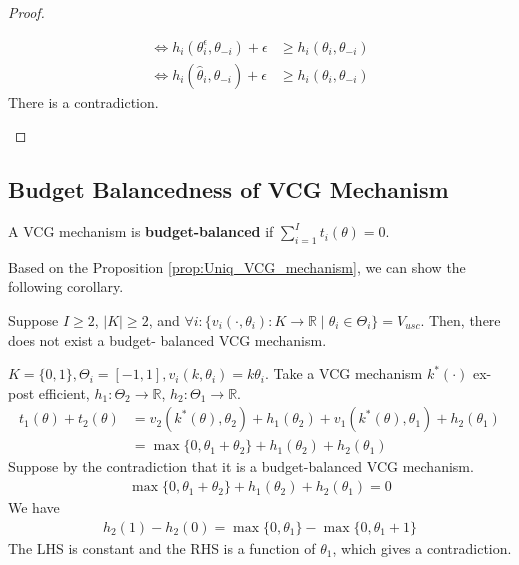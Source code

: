 \documentclass[11pt]{elegantbook}
\begin{document}
\begin{proof}
\begin{enumerate}
\begin{enumerate}[$\circ$]
\begin{equation}
\begin{aligned}
                    \Leftrightarrow h_i(\theta^\epsilon_i,\theta_{-i})+\epsilon&\geq h_i(\theta_i,\theta_{-i})\\
                    \Leftrightarrow h_i(\hat{\theta}_i,\theta_{-i})+\epsilon&\geq h_i(\theta_i,\theta_{-i})
                \end{aligned}
                \nonumber
            \end{equation}
            There is a contradiction.
        \end{enumerate}
    \end{enumerate}
\end{proof}


\subsection{Budget Balancedness of VCG Mechanism}
\begin{definition}
    \normalfont
    A VCG mechanism is \textbf{budget-balanced} if $\sum_{i=1}^It_i(\theta)=0$.
\end{definition}

Based on the Proposition \ref{prop:Uniq_VCG_mechanism}, we can show the following corollary.
\begin{corollary}
    Suppose $I\geq 2$, $|K|\geq 2$, and $\forall i: \{v_i(\cdot,\theta_i): K \rightarrow \mathbb{R}\mid \theta_i\in\Theta_i\}=V_{usc}$. Then, there does not exist a budget-
    balanced VCG mechanism.
\end{corollary}


\begin{example}
    $K=\{0,1\},\Theta_i=[-1,1], v_i(k,\theta_i)=k\theta_i$. Take a VCG mechanism $k^*(\cdot)$ ex-post efficient, $h_1:\Theta_2 \rightarrow \mathbb{R}$, $h_2:\Theta_1 \rightarrow \mathbb{R}$.
    \begin{equation}
        \begin{aligned}
            t_1(\theta)+t_2(\theta)&=v_2(k^*(\theta),\theta_2)+h_1(\theta_2)+v_1(k^*(\theta),\theta_1)+h_2(\theta_1)\\
            &=\max\{0,\theta_1+\theta_2\}+h_1(\theta_2)+h_2(\theta_1)
        \end{aligned}
        \nonumber
    \end{equation}
    Suppose by the contradiction that it is a budget-balanced VCG mechanism.
    \begin{equation}
        \begin{aligned}
            \max\{0,\theta_1+\theta_2\}+h_1(\theta_2)+h_2(\theta_1)=0
        \end{aligned}
        \nonumber
    \end{equation}
    We have
    \begin{equation}
        \begin{aligned}
            h_2(1)-h_2(0)=\max\{0,\theta_1\}-\max\{0,\theta_1+1\}
        \end{aligned}
        \nonumber
    \end{equation}
    The LHS is constant and the RHS is a function of $\theta_1$, which gives a contradiction.
\end{example}
\end{document}
